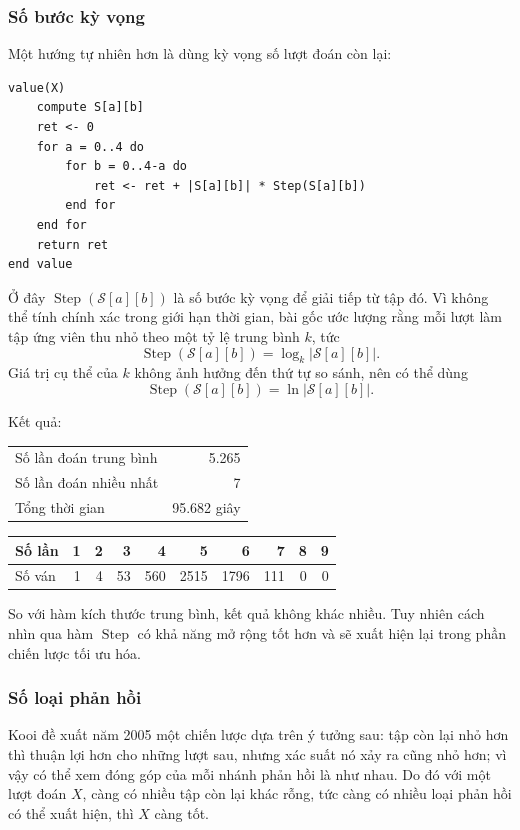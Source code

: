 \documentclass[11pt]{article}
\newcommand{\SetS}{\mathcal{S}}
\begin{document}
\subsubsection{Số bước kỳ vọng}

Một hướng tự nhiên hơn là dùng kỳ vọng số lượt đoán còn lại:
\begin{verbatim}
value(X)
    compute S[a][b]
    ret <- 0
    for a = 0..4 do
        for b = 0..4-a do
            ret <- ret + |S[a][b]| * Step(S[a][b])
        end for
    end for
    return ret
end value
\end{verbatim}
Ở đây \(\operatorname{Step}(\SetS[a][b])\) là số bước kỳ vọng để giải tiếp từ
tập đó. Vì không thể tính chính xác trong giới hạn thời gian, bài gốc ước
lượng rằng mỗi lượt làm tập ứng viên thu nhỏ theo một tỷ lệ trung bình \(k\),
tức
\[
  \operatorname{Step}(\SetS[a][b]) = \log_k |\SetS[a][b]|.
\]
Giá trị cụ thể của \(k\) không ảnh hưởng đến thứ tự so sánh, nên có thể dùng
\[
  \operatorname{Step}(\SetS[a][b]) = \ln |\SetS[a][b]|.
\]

Kết quả:
\begin{center}
\small
\begin{tabular}{|l|r|}
\hline
Số lần đoán trung bình & 5.265 \\
Số lần đoán nhiều nhất & 7 \\
Tổng thời gian & 95.682 giây \\
\hline
\end{tabular}

\medskip
\begin{tabular}{|l|rrrrrrrrr|}
\hline
Số lần & 1 & 2 & 3 & 4 & 5 & 6 & 7 & 8 & 9 \\
\hline
Số ván & 1 & 4 & 53 & 560 & 2515 & 1796 & 111 & 0 & 0 \\
\hline
\end{tabular}
\end{center}

So với hàm kích thước trung bình, kết quả không khác nhiều. Tuy nhiên cách
nhìn qua hàm \(\operatorname{Step}\) có khả năng mở rộng tốt hơn và sẽ xuất
hiện lại trong phần chiến lược tối ưu hóa.

\subsubsection{Số loại phản hồi}

Kooi đề xuất năm 2005 một chiến lược dựa trên ý tưởng sau: tập còn lại nhỏ hơn
thì thuận lợi hơn cho những lượt sau, nhưng xác suất nó xảy ra cũng nhỏ hơn;
vì vậy có thể xem đóng góp của mỗi nhánh phản hồi là như nhau. Do đó với một
lượt đoán \(X\), càng có nhiều tập còn lại khác rỗng, tức càng có nhiều loại
phản hồi có thể xuất hiện, thì \(X\) càng tốt.
\end{document}
